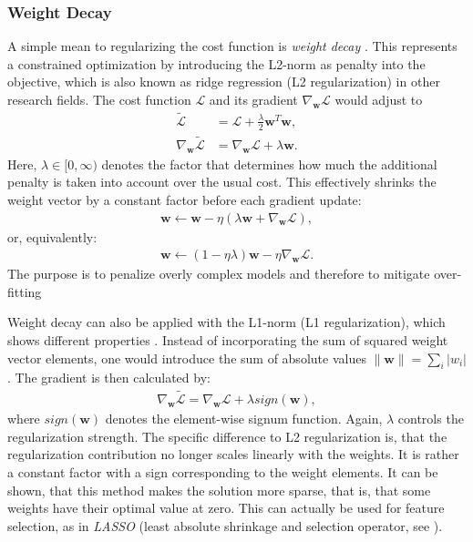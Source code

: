 \subsubsection{Weight Decay}
A simple mean to regularizing the cost function is \textit{weight decay} \cite{GoBe2016, MoHa1995}.
This represents a constrained optimization by introducing the L2-norm as penalty into the objective, which is also known as ridge regression (L2 regularization) in other research fields.
The cost function $\mathcal L$ and its gradient $\nabla_{\bm w}\mathcal L$ would adjust to
\begin{align}
	\tilde{\mathcal L} &= \mathcal L + \frac{\lambda}{2}\bm w^T\bm w,\\
	\nabla_{\bm w}\tilde{\mathcal L} &= \nabla_{\bm w}\mathcal L + \lambda\bm w.
\end{align}
Here, $\lambda\in{[0, \infty)}$ denotes the factor that determines how much the additional penalty is taken into account over the usual cost.
This effectively shrinks the weight vector by a constant factor before each gradient update:
\begin{align}
	\bm w\gets\bm w - \eta(\lambda\bm w + \nabla_{\bm w}\mathcal L),	
\end{align}
or, equivalently:
\begin{align}
	\bm w\gets(1 - \eta\lambda)\bm w - \eta\nabla_{\bm w}\mathcal L.
\end{align}
The purpose is to penalize overly complex models and therefore to mitigate over-fitting

Weight decay can also be applied with the L1-norm (L1 regularization), which shows different properties \cite{GoBe2016}.
Instead of incorporating the sum of squared weight vector elements, one would introduce the sum of absolute values $\|\bm w\| = \sum\nolimits_i|w_i|$.
The gradient is then calculated by:
\begin{align}
	\nabla_{\bm w}\tilde{\mathcal L} = \nabla_{\bm w}\mathcal L + \lambda sign(\bm w),
\end{align}
where $sign(\bm w)$ denotes the element-wise signum function.
Again, $\lambda$ controls the regularization strength.
The specific difference to L2 regularization is, that the regularization contribution no longer scales linearly with the weights.
It is rather a constant factor with a sign corresponding to the weight elements.
It can be shown, that this method makes the solution more sparse, that is, that some weights have their optimal value at zero.
This can actually be used for feature selection, as in \textit{LASSO} (least absolute shrinkage and selection operator, see \cite{GoBe2016}).

